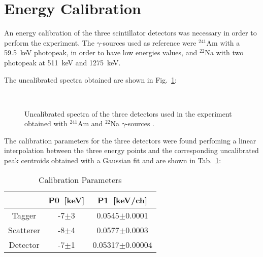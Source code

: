 \newpage
\section*{Energy Calibration}

An energy calibration of the three scintillator detectors was necessary in order to perform the experiment. The $\gamma$-sources used as reference were $^{241}$Am with a 59.5~keV photopeak, in order to have low energies values, and $^{22}$Na with two photopeak at 511~keV and 1275~keV.

The uncalibrated spectra obtained are shown in Fig.~\ref{Fig:Uncalibrated_spectra}:

\begin{figure}[h!]
	\centering
	 \quad
	 \quad
	 \quad
	 \quad
	 \quad
	 \\
	\caption{Uncalibrated spectra of the three detectors used in the experiment obtained with $^{241}$Am and $^{22}$Na $\gamma$-sources .}
	\label{Fig:Uncalibrated_spectra}
\end{figure}

The calibration parameters for the three detectors were found perfoming a linear interpolation between the three energy points and the corresponding uncalibrated peak centroids obtained with a Gaussian fit and are shown in Tab.~\ref{Tab:Calibration parameters}:

\begin{table}[H]
\centering
\begin{tabular}{c|cc}
\toprule
\toprule
 & P0~[keV] & P1~[keV/ch] \\
\midrule
Tagger & -7$\pm$3 &  0.0545$\pm$0.0001 \\
Scatterer & -8$\pm$4 & 0.0577$\pm$0.0003 \\
Detector & -7$\pm$1 & 0.05317$\pm$0.00004 \\
\bottomrule
\bottomrule
\end{tabular}
\caption{Calibration Parameters}
\label{Tab:Calibration parameters}
\end{table}